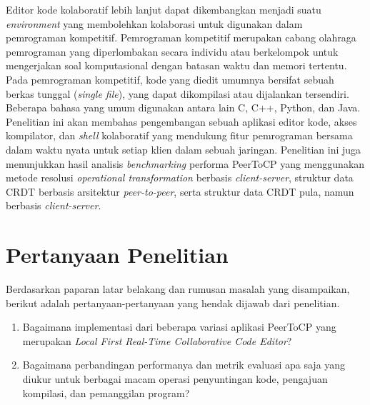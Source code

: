 Editor kode kolaboratif lebih lanjut dapat dikembangkan menjadi suatu \textit{environment} yang membolehkan kolaborasi untuk digunakan dalam pemrograman kompetitif. Pemrograman kompetitif merupakan cabang olahraga pemrograman yang diperlombakan secara individu atau berkelompok untuk mengerjakan soal komputasional dengan batasan waktu dan memori tertentu. Pada pemrograman kompetitif, kode yang diedit umumnya bersifat sebuah berkas tunggal (\textit{single file}), yang dapat dikompilasi atau dijalankan tersendiri. Beberapa bahasa yang umum digunakan antara lain C, C++, Python, dan Java. Penelitian ini akan membahas pengembangan sebuah aplikasi editor kode, akses kompilator, dan \textit{shell} kolaboratif yang mendukung fitur pemrograman bersama dalam waktu nyata untuk setiap klien dalam sebuah jaringan. Penelitian ini juga menunjukkan hasil analisis \textit{benchmarking} performa PeerToCP yang menggunakan metode resolusi \textit{operational transformation} berbasis \textit{client-server}, struktur data CRDT berbasis arsitektur \textit{peer-to-peer}, serta struktur data CRDT pula, namun berbasis \textit{client-server}.

\section{Pertanyaan Penelitian}
\label{sec:definisiMasalah}
Berdasarkan paparan latar belakang dan rumusan masalah yang disampaikan, berikut adalah pertanyaan-pertanyaan yang hendak dijawab dari penelitian.

\begin{enumerate}[noitemsep]
	\item Bagaimana implementasi dari beberapa variasi aplikasi PeerToCP yang merupakan \textit{Local First Real-Time Collaborative Code Editor}?
    \item Bagaimana perbandingan performanya dan metrik evaluasi apa saja yang diukur untuk berbagai macam operasi penyuntingan kode, pengajuan kompilasi, dan pemanggilan program?
\end{enumerate}

